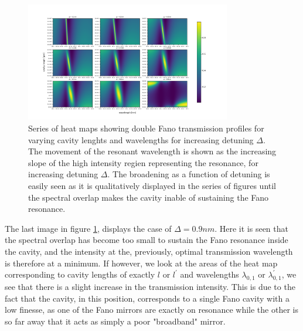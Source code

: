 \begin{figure}[h!]
    \centering
    \includegraphics[width=0.8\textwidth]{figures/cmaps_detuning_30um.pdf}
    \caption{Series of heat maps showing double Fano transmission profiles for varying cavity lenghts and wavelengths for increasing detuning $\Delta$. The movement of the resonant wavelength is shown as the increasing slope of the high intensity regien representing the resonance, for increasing detuning $\Delta$. The broadening as a function of detuning is easily seen as it is qualitatively displayed in the series of figures until the spectral overlap makes the cavity inable of sustaining the Fano resonance.}
    \label{fig:cmaps_detuning}
\end{figure}

The last image in figure \ref{fig:cmaps_detuning}, displays the case of $\Delta=0.9nm$. Here it is seen that the spectral overlap has become too small to sustain the Fano resonance inside the cavity, and the intensity at the, previously, optimal transmission wavelength is therefore at a minimum.  If however, we look at the areas of the heat map corresponding to cavity lengths of exactly $l$ or $l^{\prime}$ and wavelengths $\lambda_{0,1}$ or $\lambda_{0,1}^{\prime}$, we see that there is a slight increase in the transmission intensity. This is due to the fact that the cavity, in this position, corresponds to a single Fano cavity with a low finesse, as one of the Fano mirrors are exactly on resonance while the other is so far away that it acts as simply a poor "broadband" mirror. 

